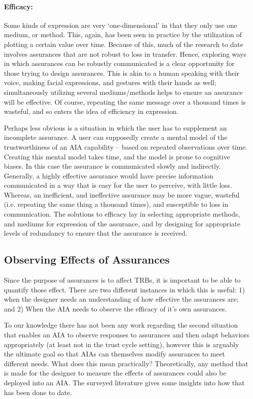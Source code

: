     \paragraph{Efficacy:} Some kinds of expression are very `one-dimensional' in that they only use one medium, or method. This, again, has been seen in practice by the utilization of plotting a certain value over time. Because of this, much of the research to date involves assurances that are not robust to loss in transfer. Hence, exploring ways in which assurances can be robustly communicated is a clear opportunity for those trying to design assurances. This is akin to a human speaking with their voice, making facial expressions, and gestures with their hands as well; simultaneously utilizing several mediums/methods helps to ensure an assurance will be effective. Of course, repeating the same message over a thousand times is wasteful, and so enters the idea of efficiency in expression.

    Perhaps less obvious is a situation in which the user has to supplement an incomplete assurance. A user can supposedly create a mental model of the trustworthiness of an AIA capability -- based on repeated observations over time. Creating this mental model takes time, and the model is prone to cognitive biases. In this case the assurance is communicated slowly and indirectly. Generally, a highly effective assurance would have precise information communicated in a way that is easy for the user to perceive, with little loss. Whereas, an inefficient, and ineffective assurance may be more vague, wasteful (i.e. repeating the same thing a thousand times), and susceptible to loss in communication. The solutions to efficacy lay in selecting appropriate methods, and mediums for expression of the assurance, and by designing for appropriate levels of redundancy to ensure that the assurance is received.

\subsection{Observing Effects of Assurances} \label{sec:measuring_effects}

    Since the purpose of assurances is to affect TRBs, it is important to be able to quantify those effect. There are two different instances in which this is useful: 1) when the designer needs an understanding of how effective the assurances are; and 2) When the  AIA needs to observe the efficacy of it's own assurances.
    
    To our knowledge there has not been any work regarding the second situation that enables an AIA to observe responses to assurances and then adapt behaviors appropriately (at least not in the trust cycle setting), however this is arguably the ultimate goal so that AIAs can themselves modify assurances to meet different needs. What does this mean practically? Theoretically, any method that is made for the designer to measure the effects of assurances could also be deployed into an AIA. The surveyed literature gives some insights into how that has been done to date.
   
